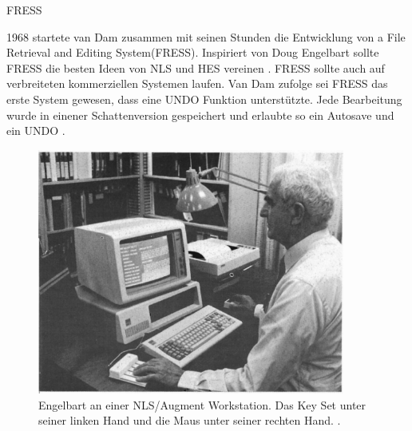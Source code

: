 \begin{section}{FRESS}
\label{sec:fress}
	
1968 startete van Dam zusammen mit seinen Stunden die Entwicklung von \glqq a File Retrieval and Editing System\grqq{ }(FRESS). Inspiriert von Doug Engelbart sollte FRESS die besten Ideen von NLS und HES vereinen \cite[S.887 und 890]{Dam1988}. FRESS sollte auch auf verbreiteten kommerziellen Systemen laufen. Van Dam zufolge sei FRESS das erste System gewesen, dass eine UNDO Funktion unterstützte. Jede Bearbeitung wurde in einener Schattenversion gespeichert und erlaubte so ein Autosave und ein UNDO \cite[S.891]{Dam1988}.

\begin{figure}[H]
	\centering
	\includegraphics[width=0.9\textwidth]{image/augment}
	\caption{Engelbart an einer NLS/Augment Workstation. Das Key Set unter seiner linken Hand und die Maus unter seiner rechten Hand. \cite{Conklin1987}.}
	\label{fig:augment}
\end{figure}


\end{section}
